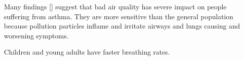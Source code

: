 Many findings [] suggest that bad air quality has severe impact on people suffering from asthma. They are more sensitive than the general population because pollution particles inflame and irritate airways and lungs causing and worsening symptoms. 

Children and young adults have faster breathing rates.